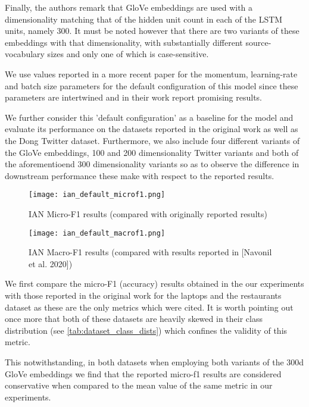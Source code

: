\documentclass[../../fyp.tex]{subfiles}
\begin{document}
Finally, the authors remark that GloVe \cite{pennington} embeddings are used with a dimensionality matching that of the hidden unit count in each of the LSTM units, namely 300. It must be noted however that there are two variants of these embeddings with that dimensionality, with substantially different source-vocabulary sizes and only one of which is case-sensitive.

We use values reported in a more recent paper \cite{zhang2018} for the momentum, learning-rate and batch size parameters for the default configuration of this model since these parameters are intertwined and in their work \cite{zhang2018} report promising results. 

We further consider this 'default configuration' as a baseline for the model and evaluate its performance on the datasets reported in the original work as well as the Dong Twitter dataset. Furthermore, we also include four different variants of the GloVe embeddings, 100 and 200 dimensionality Twitter variants and both of the aforementioend 300 dimensionality variants so as to observe the difference in downstream performance these make with respect to the reported results. 

\begin{figure}[!ht]
	\centering
	\texttt{[image: ian\_default\_microf1.png]}
	\caption{IAN Micro-F1 results (compared with originally reported results)}
	\label{fig:ffnn}
\end{figure}

\begin{figure}[!ht]
	\centering
	\texttt{[image: ian\_default\_macrof1.png]}
	\caption{IAN Macro-F1 results (compared with results reported in [Navonil et al. 2020])}
	\label{fig:ffnn}
\end{figure}

We first compare the micro-F1 (accuracy) results obtained in the our experiments with those reported in the original work \cite{dehongma2017} for the laptops and the restaurants dataset as these are the only metrics which were cited. It is worth pointing out once more that both of these datasets are heavily skewed in their class distribution (see \ref{tab:dataset_class_dists}) which confines the validity of this metric.

This notwithstanding, in both datasets when employing both variants of the 300d GloVe embeddings we find that the reported micro-f1 results are considered conservative when compared to the mean value of the same metric in our experiments. 
\end{document}

